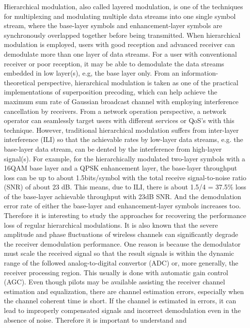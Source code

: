 \documentclass[conference]{IEEEtran}
\begin{document}
Hierarchical modulation, also called layered modulation, is one of
the techniques for multiplexing and modulating multiple data
streams into one single symbol stream, where the base-layer
symbols and enhancement-layer symbols are synchronously overlapped
together before being transmitted. When hierarchical modulation is
employed, users with good reception and advanced receiver can
demodulate more than one layer of data streams. For a user with
conventional receiver or poor reception, it may be able to
demodulate the data streams embedded in low layer(s), e.g, the
base layer only. From an information-theoretical perspective,
hierarchical modulation is taken as one of the practical
implementations of superposition precoding, which can help achieve
the maximum sum rate of Gaussian broadcast channel with employing
interference cancellation by receivers. From a network operation
perspective, a network operator can seamlessly target users with
different services or QoS's with this technique. However,
traditional hierarchical modulation suffers from inter-layer
interference (ILI) so that the achievable rates by low-layer data
streams, e.g. the base-layer data stream, can be dented by the
interference from high-layer signal(s). For example, for the
hierarchically modulated two-layer symbols with a 16QAM base layer
and a QPSK enhancement layer, the base-layer throughput loss can
be up to about 1.5bits/symbol with the total receive
signal-to-noise ratio (SNR) of about 23 dB. This means, due to
ILI, there is about 1.5/4 = 37.5\% loss of the base-layer
achievable throughput with 23dB SNR. And the demodulation error
rate of either the base-layer and enhancement-layer symbols
increases too. Therefore it is interesting to study the approaches
for recovering the performance loss of regular hierarchical
modulations. It is also known that the severe amplitude and phase
fluctuations of wireless channels can significantly degrade the
receiver demodulation performance. One reason is because the
demodulator must scale the received signal so that the result
signals is within the dynamic range of the followed
analog-to-digital convertor (ADC) or, more generally, the receiver
processing region. This usually is done with automatic gain
control (AGC). Even though pilots may be available assisting the
receiver channel estimation and equalization, there are channel
estimation errors, especially when the channel coherent time is
short. If the channel is estimated in errors, it can lead to
improperly compensated signals and incorrect demodulation even in
the absence of noise. Therefore it is important to understand and
\end{document}
